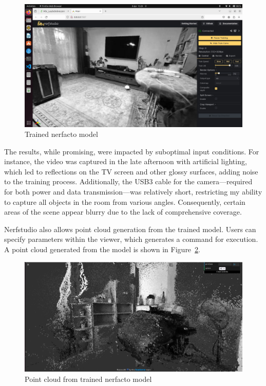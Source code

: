 \begin{figure}[htbp]
	\centering
	\includegraphics[width=150mm, keepaspectratio]{figures_jpg/trained_nerf_karcag1.jpg}
	\caption{Trained nerfacto model}
	\label{fig:trained_nerf_karcag}
\end{figure}

The results, while promising, were impacted by suboptimal input conditions. For instance, the video was captured in the late afternoon with artificial lighting, which led to reflections on the TV screen and other glossy surfaces, adding noise to the training process. Additionally, the USB3 cable for the camera—required for both power and data transmission—was relatively short, restricting my ability to capture all objects in the room from various angles. Consequently, certain areas of the scene appear blurry due to the lack of comprehensive coverage.

Nerfstudio also allows point cloud generation from the trained model. Users can specify parameters within the viewer, which generates a command for execution. A point cloud generated from the model is shown in Figure~\ref{fig:nerfstudio_point_cloud}.

\begin{figure}[htbp]
	\centering
	\includegraphics[width=150mm, keepaspectratio]{figures_jpg/nerfacto_point_cloud1.jpg}
	\caption{Point cloud from trained nerfacto model}
	\label{fig:nerfstudio_point_cloud}
\end{figure}

